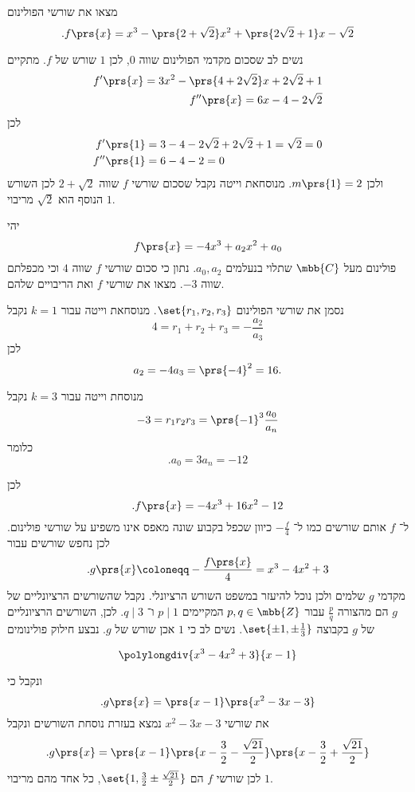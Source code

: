\documentclass[article, 10pt,oneside]{article}
\begin{document}
\begin{exercise}
מצאו את שורשי הפולינום
\[\text{.} f\prs{x} = x^3 - \prs{2 + \sqrt{2}}x^2 + \prs{2 \sqrt{2} + 1}x - \sqrt{2}\]
\end{exercise}

\begin{solution}
נשים לב שסכום מקדמי הפולינום שווה
$0$,
לכן
$1$
שורש של
$f$.
מתקיים
\begin{align*}
f'\prs{x} = 3x^2 - \prs{4 + 2\sqrt{2}} x + 2 \sqrt{2} + 1 \\
f''\prs{x} = 6x - 4 - 2 \sqrt{2}
\end{align*}
לכן
\begin{align*}
f'\prs{1} &= 3 - 4 - 2\sqrt{2} + 2 \sqrt{2} + 1 = \sqrt{2} = 0 \\
f''\prs{1} &= 6-4-2 = 0
\end{align*}
ולכן
$m\prs{1} = 2$.
מנוסחאת וייטה נקבל שסכום שורשי
$f$
שווה
$2+\sqrt{2}$
לכן השורש הנוסף הוא
$\sqrt{2}$
מריבוי
$1$.
\end{solution}

\begin{exercise}
יהי
\[f\prs{x} = -4 x^3 + a_2 x^2 + a_0\]
פולינום מעל
$\mbb{C}$
שתלוי בנעלמים
$a_0, a_2$.
נתון כי סכום שורשי
$f$
שווה
$4$
וכי מכפלתם שווה
$-3$.
מצאו את שורשי
$f$
ואת הריבויים שלהם.
\end{exercise}

\begin{solution}
נסמן את שורשי הפולינום
$\set{r_1, r_2, r_3}$.
מנוסחאת וייטה עבור
$k = 1$
נקבל
\[4 = r_1 + r_2 + r_3 = - \frac{a_2}{a_3}\]
לכן
\[a_2 = -4 a_3 = \prs{-4}^2 = 16 \text{.}\]

מנוסחת וייטה עבור
$k=3$
נקבל
\[-3 = r_1 r_2 r_3 = \prs{-1}^3 \frac{a_0}{a_n}\]
כלומר
\[\text{.} a_0 = 3 a_n = -12\]

לכן
\[\text{.} f\prs{x} = -4x^3 + 16x^2 - 12\]
ל־%
$f$
אותם שורשים כמו ל־%
$-\frac{f}{4}$
כיוון שכפל בקבוע שונה מאפס אינו משפיע על שורשי פולינום.
לכן נחפש שורשים עבור
\[\text{.} g\prs{x} \coloneqq -\frac{f\prs{x}}{4} = x^3 - 4x^2 + 3\]
מקדמי
$g$
שלמים ולכן נוכל להיעזר במשפט השורש הרציונלי. נקבל שהשורשים הרציונליים של
$g$
הם מהצורה
$\frac{p}{q}$
עבור
$p,q \in \mbb{Z}$
המקיימים
$p \mid 1$
ו־%
$q \mid 3$.
לכן, השורשים הרציונליים של
$g$
בקבוצה
$\set{\pm 1, \pm \frac{1}{3}}$.
נשים לב כי
$1$
אכן שורש של
$g$.
נבצע חילוק פולינומים

\begin{otherlanguage}{english}
\[
\polylongdiv{x^3 - 4x^2 + 3}{x-1}
\]
\end{otherlanguage}

ונקבל כי
\[\text{.} g\prs{x} = \prs{x-1}\prs{x^2 - 3x - 3}\]
את שורשי
$x^2 - 3x - 3$
נמצא בעזרת נוסחת השורשים ונקבל
\[\text{.} g\prs{x} = \prs{x-1} \prs{x-\frac{3}{2} - \frac{\sqrt{21}}{2}} \prs{x - \frac{3}{2} + \frac{\sqrt{21}}{2}}\]
לכן שורשי
$f$
הם
$\set{1, \frac{3}{2} \pm \frac{\sqrt{21}}{2}}$,
כל אחד מהם מריבוי
$1$.
\end{solution}
\end{document}
